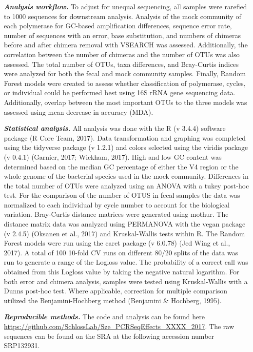 \documentclass[11pt,]{article}
\begin{document}
\textbf{\emph{Analysis workflow.}} To adjust for unequal sequencing, all
samples were rarefied to 1000 sequences for downstream analysis.
Analysis of the mock community of each polymerase for GC-based
amplification differences, sequence error rate, number of sequences with
an error, base substitution, and numbers of chimeras before and after
chimera removal with VSEARCH was assessed. Additionally, the correlation
between the number of chimeras and the number of OTUs was also assessed.
The total number of OTUs, taxa differences, and Bray-Curtis indices were
analyzed for both the fecal and mock community samples. Finally, Random
Forest models were created to assess whether classification of
polymerase, cycles, or individual could be performed best using 16S rRNA
gene sequencing data. Additionally, overlap between the most important
OTUs to the three models was assessed using mean decrease in accuracy
(MDA).

\textbf{\emph{Statistical analysis.}} All analysis was done with the R
(v 3.4.4) software package (R Core Team, 2017). Data transformation and
graphing was completed using the tidyverse package (v 1.2.1) and colors
selected using the viridis package (v 0.4.1) (Garnier, 2017; Wickham,
2017). High and low GC content was determined based on the median GC
percentage of either the V4 region or the whole genome of the bacterial
species used in the mock community. Differences in the total number of
OTUs were analyzed using an ANOVA with a tukey post-hoc test. For the
comparison of the number of OTUS in fecal samples the data was
normalized to each individual by cycle number to account for the
biological variation. Bray-Curtis distance matrices were generated using
mothur. The distance matrix data was analyzed using PERMANOVA with the
vegan package (v 2.4.5) (Oksanen et al., 2017) and Kruskal-Wallis tests
within R. The Random Forest models were run using the caret package (v
6.0.78) (Jed Wing et al., 2017). A total of 100 10-fold CV runs on
different 80/20 splits of the data was run to generate a range of the
Logloss value. The probability of a correct call was obtained from this
Logloss value by taking the negative natural logarithm. For both error
and chimera analysis, samples were tested using Kruskal-Wallis with a
Dunns post-hoc test. Where applicable, correction for multiple
comparison utilized the Benjamini-Hochberg method (Benjamini \&
Hochberg, 1995).

\textbf{\emph{Reproducible methods.}} The code and analysis can be found
here \url{https://github.com/SchlossLab/Sze_PCRSeqEffects_XXXX_2017}.
The raw sequences can be found on the SRA at the following accession
number SRP132931.
\end{document}
